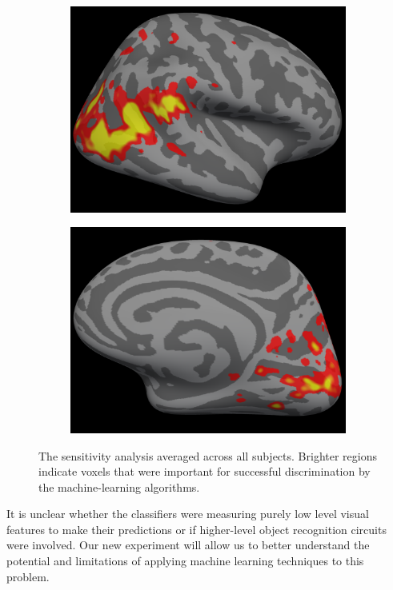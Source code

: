 \documentclass[12pt]{article}
\begin{document}
\begin{figure}
\begin{subfigure}{0.4\textwidth}
\includegraphics[width=\textwidth]{figures/rh-lateral-smax-average}
\caption{}
\label{fig:rh-lateral-smax-average}
\end{subfigure}
\begin{subfigure}{0.4\textwidth}
\centering
\includegraphics[width=\textwidth]{figures/rh-medial-smax-average}
\caption{}
\label{fig:rh-medial-smax-average}
\end{subfigure}
\caption{The sensitivity analysis averaged across all subjects.
Brighter regions indicate voxels that were important for successful discrimination by the machine-learning algorithms.}
\label{fig:preliminary-data-sensitivity}
\end{figure}
It is unclear whether the classifiers were measuring purely low level visual features to make their predictions or if higher-level object recognition circuits were involved.
Our new experiment will allow us to better understand the potential and limitations of applying machine learning techniques to this problem.
\end{document}

